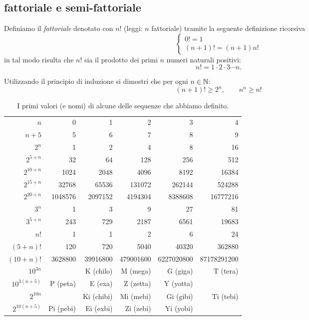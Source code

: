 \subsection{fattoriale e semi-fattoriale}

Definiamo il 
\emph{fattoriale}%
%
%
%
denotato con $n!$ (leggi: $n$ fattoriale) 
tramite la seguente definizione ricorsiva
\[
  \begin{cases}
    0! = 1 \\
    (n+1)! = (n+1) n!
  \end{cases}
\]
in tal modo risulta che $n!$ sia il prodotto dei primi $n$ numeri naturali positivi:
\[
  n! = 1 \cdot 2 \cdot 3 \cdots n.  
\]

\begin{exercise}
  \label{ex:6734098}%
  Utilizzando il principio di induzione
  si dimostri che per ogni $n\in {\mathbb N}$:
  \[
    (n+1)! \ge 2^n, \qquad
    n^n \ge n!
  \]
\end{exercise}

\begin{table}
  \begin{center}
  \begin{tabular}{r|>{\small}r>{\small}r>{\small}r>{\small}r>{\small}r}
  $n$       & 0 & 1 & 2 & 3 & 4 \\
  \footnotesize $n+5$     & 5 & 6 & 7 & 8 & 9 \\ \hline
  $2^n$     & 1 & 2 & 4 & 8 & 16 \\
  \footnotesize $2^{5+n}$ & 32 & 64 & 128 & 256 & 512 \\
  \footnotesize $2^{10+n}$ & 1024 & 2048 & 4096 & 8192 & 16384 \\
  \footnotesize $2^{15+n}$ & 32768 & 65536 & 131072 & 262144 & 524288 \\
  \footnotesize $2^{20+n}$ & 1048576 & 2097152 & 4194304 & 8388608 & 16777216 \\  \hline
  $3^n$                    & 1 & 3 & 9 & 27 & 81 \\
  \footnotesize $3^{5+n}$  & 243 & 729 & 2187 & 6561 & 19683 \\  \hline
  $n!$      & 1 & 1 & 2 & 6 & 24 \\
  \footnotesize $(5+n)!$  & 120 & 720 & 5040 & 40320 & 362880 \\
  \footnotesize $(10+n)!$  & 3628800 & 39916800 & 479001600 & 6227020800 & 87178291200 \\ \hline
  \footnotesize $10^{3n}$  &  & K (chilo) & M (mega) & G (giga) & T (tera) \\ 
  \footnotesize $10^{3(n+5)}$  & P (peta) & E (exa) & Z (zetta) & Y (yotta) \\ \hline
  \footnotesize $2^{10n}$  &  & Ki (chibi) & Mi (mebi) & Gi (gibi) & Ti (tebi) \\
  \footnotesize $2^{10(n+5)}$ & Pi (pebi)& Ei (exbi) & Zi (zebi) & Yi (yobi)
  \end{tabular}
  \end{center}
  \caption{I primi valori (e nomi) di alcune delle sequenze che abbiamo definito.}
  \end{table}
  
